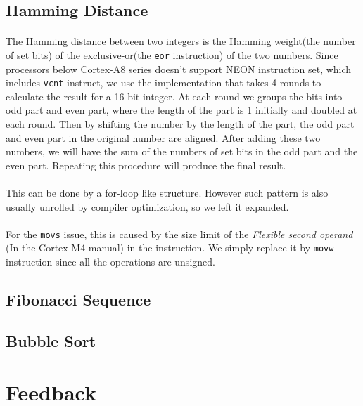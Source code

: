 \subsection{Hamming Distance}
\paragraph{}
The Hamming distance between two integers is the Hamming weight(the number of set bits)
of the exclusive-or(the \texttt{eor} instruction) of the two numbers.
Since processors below Cortex-A8 series doesn't support NEON instruction set, which includes \texttt{vcnt} instruct, we use the implementation
that takes 4 rounds to calculate the result for a 16-bit integer. At each round we groups the bits into odd part and even part,
where the length of the part is 1 initially and doubled at each round.
Then by shifting the number by the length of the part, the odd part and even part in the original number are aligned. 
After adding these two numbers, we will have the sum of the numbers of set bits in the odd part and the even part.
Repeating this procedure will produce the final result.
\paragraph{}
This can be done by a for-loop like structure. However such pattern is also usually unrolled by compiler optimization,
so we left it expanded.
\paragraph{}
For the \texttt{movs} issue, this is caused by the size limit of the \textit{Flexible second operand}
(In the Cortex-M4 manual) in the instruction.
We simply replace it by \texttt{movw} instruction since all the operations are unsigned.
\subsection{Fibonacci Sequence}
\paragraph{}
\subsection{Bubble Sort}
\paragraph{}
\section{Feedback}
\paragraph{}
